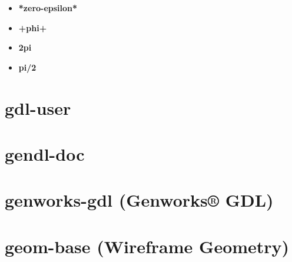 \documentclass [11pt]{book}
\begin{document}
\begin{itemize}
\item {}
\label{prim:*zero-epsilon*}
\textbf{*zero-epsilon*}





\item {}
\label{prim:+phi+}
\textbf{+phi+}





\item {}
\label{prim:2pi}
\textbf{2pi}





\item {}
\label{prim:pi/2}
\textbf{pi/2}





\end{itemize}





\section{gdl-user }

\label{sec:gdl-user}







\section{gendl-doc }

\label{sec:gendl-doc}







\section{genworks-gdl (Genworks® GDL)}

\label{sec:genworks-gdl(genworks®gdl)}







\section{geom-base (Wireframe Geometry)}

\label{sec:geom-base(wireframegeometry)}
\end{document}
